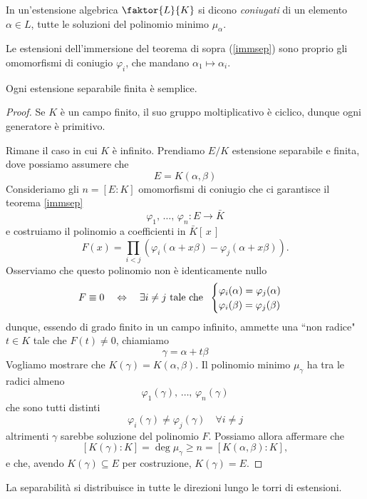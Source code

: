 \begin{multicols}{2}
\begin{definition}
	In un'estensione algebrica $ \faktor{L}{K} $ si dicono \emph{coniugati} di un elemento $ \alpha \in L $, tutte le soluzioni del polinomio minimo $ \mu_\alpha $.
\end{definition}

\begin{remark}
	Le estensioni dell'immersione del teorema di sopra (\ref{immsep}) sono proprio gli omomorfismi di coniugio $ \varphi_i $, che mandano $ \alpha_1 \mapsto \alpha_i $.
\end{remark}

\begin{theorem}\label{primitivo}
	Ogni estensione separabile finita è semplice.
\end{theorem}
\begin{proof}
	Se $ K $ è un campo finito, il suo gruppo moltiplicativo è ciclico, dunque ogni generatore è primitivo.
	
	Rimane il caso in cui $ K $ è infinito.
	Prendiamo $ E/K $ estensione separabile e finita, dove possiamo assumere che
	\[ E = K(\alpha, \beta) \]
	Consideriamo gli $ n = [E:K] $ omomorfismi di coniugio che ci garantisce il teorema \ref{immsep}
	\[ \varphi_1,\, \dots,\, \varphi_n : E \to \bar{K}  \]
	e costruiamo il polinomio a coefficienti in $ \bar{K}[\,x\,] $
	\[ F(x) = \prod_{i < j}{\left(\varphi_i(\alpha + x \beta) - \varphi_j(\alpha + x \beta)\right)}. \]
	Osserviamo che questo polinomio non è identicamente nullo
	\[ F \equiv 0 \quad\Leftrightarrow\quad \exists i \neq j \text{ tale che }\; \begin{cases}
	\varphi_i(\alpha) = \varphi_j(\alpha) \\
	\varphi_i(\beta) = \varphi_j(\beta)
	\end{cases} \]
	dunque, essendo di grado finito in un campo infinito, ammette una \textquotedblleft non radice" $ t \in K $ tale che
	$  F(t) \neq 0  $, chiamiamo 
	\[ \gamma = \alpha + t\beta \]
	Vogliamo mostrare che $ K(\gamma) = K(\alpha, \beta) $. Il polinomio minimo $ \mu_\gamma $ ha tra le radici almeno
	\[ \varphi_1{(\gamma)}, \, \dots, \, \varphi_n{(\gamma)} \]
	che sono tutti distinti
	\[ \varphi_i(\gamma) \neq \varphi_j(\gamma) \quad\forall i \neq j \]
	altrimenti $ \gamma $ sarebbe soluzione del polinomio $ F $. Possiamo allora affermare che
	\[ [K(\gamma):K] = \deg{\mu_\gamma} \geq n = [K(\alpha, \beta):K], \]
	e che, avendo $K(\gamma) \subseteq E $ per costruzione, $ K(\gamma) = E $.
\end{proof}

\begin{remark}
	La separabilità si distribuisce in tutte le direzioni lungo le torri di estensioni.
\end{remark}
\end{multicols}

